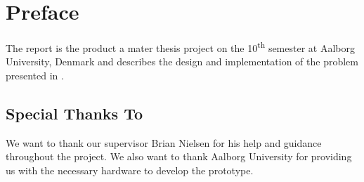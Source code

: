 \section*{Preface}\label{sec:preface}
The report is the product a mater thesis project on the 10\textsuperscript{th} semester at Aalborg University, Denmark and describes the design and implementation of the problem presented in .

\subsection*{Special Thanks To}
We want to thank our supervisor Brian Nielsen for his help and guidance throughout the project. We also want to thank Aalborg University for providing us with the necessary hardware to develop the prototype.

